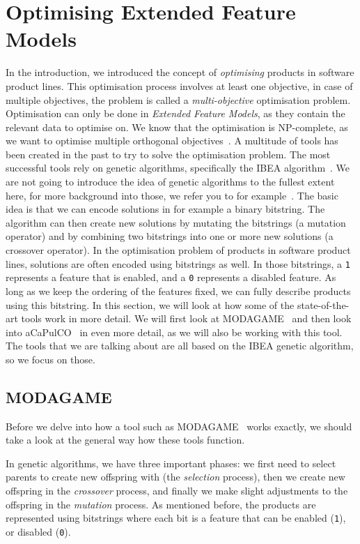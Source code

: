 \section{Optimising Extended Feature Models}\label{sec:tools}
In the introduction, we introduced the concept of \emph{optimising}
products in software product lines. This optimisation process involves
at least one objective, in case of multiple objectives, the problem is
called a \emph{multi-objective} optimisation problem. Optimisation can only be done
in \emph{Extended Feature Models}, as they contain the relevant data
to optimise on. We know that the optimisation is NP-complete, as we want
to optimise multiple orthogonal objectives~\cite{ochoa2018npcomplete}.
A multitude of tools has been created in the past to try to solve the
optimisation problem. The most successful tools rely on genetic algorithms,
specifically the IBEA algorithm~\cite{zitzler2004ibea}. We are not going
to introduce the idea of genetic algorithms to the fullest extent here,
for more background into those, we refer you to for
example~\cite{kramer2017geneticalgos}. The basic idea is that we can
encode solutions in for example a binary bitstring. The algorithm can then
create new solutions by mutating the bitstrings (a mutation operator) and
by combining two bitstrings into one or more new solutions (a crossover 
operator). In the optimisation problem of products in software product lines,
solutions are often encoded using bitstrings as well. In those bitstrings,
a \texttt{1} represents a feature that is enabled, and a \texttt{0} 
represents a disabled feature. As long as we keep the ordering of the
features fixed, we can fully describe products using this bitstring.
In this section, we will look at how some of the state-of-the-art tools work
in more detail. We will first look at MODAGAME~\cite{pascual2015modagame}
and then look into aCaPulCO~\cite{horcas2022breakit} in even more detail, as 
we will also be working with this tool. The tools that we are talking about
are all based on the IBEA genetic algorithm, so we focus on those.

\subsection{MODAGAME}\label{sec:modagame}
Before we delve into how a tool such as MODAGAME~\cite{pascual2015modagame}
works exactly, we should take a look at the general way how these tools
function.

In genetic algorithms, we have three important phases: we first need to
select parents to create new offspring with (the \emph{selection} process),
then we create new offspring in the \emph{crossover} process, and finally
we make slight adjustments to the offspring in the \emph{mutation} process.
As mentioned before, the products are represented using bitstrings where
each bit is a feature that can be enabled (\texttt{1}), or disabled 
(\texttt{0}).

